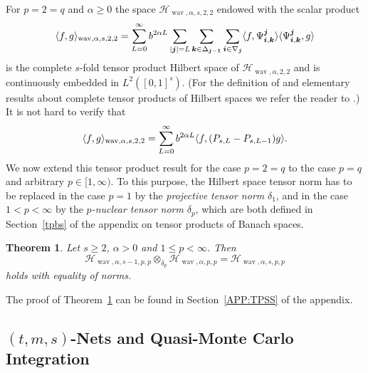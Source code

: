 \documentclass[12pt]{article}
\DeclareMathOperator{\wav}{wav}
\newtheorem{theorem}{Theorem}
\newcommand{\bsk}{\boldsymbol{k}}
\newcommand{\bsi}{\boldsymbol{i}}
\newcommand{\bsj}{\boldsymbol{j}}
\newcommand{\HH}{\mathcal{H}}
\begin{document}
For $p=2=q$ and $\alpha \ge 0$ the space $\HH_{\wav,\alpha,s,2,2}$
endowed with the scalar product
\begin{equation*}
\langle f,g \rangle_{\wav,\alpha, s,2,2}
= \sum^\infty_{L=0} b^{2\alpha L} \sum_{|\bsj|=L}
\sum_{\bsk\in \Delta_{\bsj -{\bf 1}}} \sum_{\bsi \in \nabla_{\bsj}}
\langle f, \Psi^{\bsj}_{\bsi,\bsk} \rangle
\langle \Psi^{\bsj}_{\bsi,\bsk}, g \rangle
\end{equation*}
is the complete $s$-fold tensor product Hilbert space of
$\HH_{\wav,\alpha,2,2}$ and is continuously embedded in $L^2([0,1]^s)$.
(For the definition of and elementary results about complete tensor
products of Hilbert spaces we refer the reader to \cite{Wei}.)
It is not hard to verify that
\begin{equation*}
\langle f,g \rangle_{\wav,\alpha,s,2,2} =
\sum^\infty_{L=0} b^{2\alpha L}
\langle f, (P_{s,L} - P_{s,L-1})g \rangle.\\
\end{equation*}
We now extend this tensor product result for the case $p=2=q$ to the case $p=q$ and arbitrary $p \in [1,\infty)$. 
To this purpose, the Hilbert space tensor norm has to be replaced in the case $p=1$ by  the
\emph{projective tensor norm} $\delta_1$, and in the case $1<p<\infty$ by the
\emph{$p$-nuclear tensor norm} $\delta_p$, which are both defined in Section~\ref{tpbs}
of the appendix on tensor products of Banach spaces.

\begin{theorem}\label{tensor17}
 Let $s\ge 2$, $\alpha >0$ and $1\le p < \infty$. Then
 \[
  \HH_{\wav,\alpha,s-1,p,p} \otimes_{\delta_p}  \HH_{\wav,\alpha,p,p} =
   \HH_{\wav,\alpha,s,p,p} 
 \]
 holds with equality of norms. 
 \end{theorem}

The proof of Theorem~\ref{tensor17} can be found in Section~\ref{APP:TPSS} of the appendix.



\subsection{$(t,m,s)$-Nets and Quasi-Monte Carlo Integration}
\label{Subsec:QMC}

\end{document}
